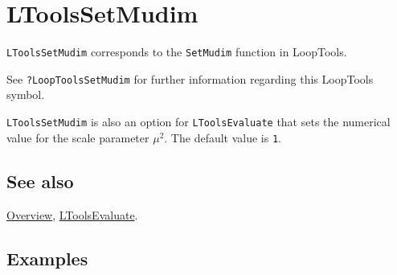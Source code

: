 \documentclass[../FeynHelpersManual.tex]{subfiles}
\begin{document}
\hypertarget{ltoolssetmudim}{
\section{LToolsSetMudim}\label{ltoolssetmudim}}

\texttt{LToolsSetMudim} corresponds to the \texttt{SetMudim} function in
LoopTools.

See \texttt{?LoopTools\textasciigrave SetMudim} for further information
regarding this LoopTools symbol.

\texttt{LToolsSetMudim} is also an option for \texttt{LToolsEvaluate}
that sets the numerical value for the scale parameter \(\mu^2\). The
default value is \texttt{1}.

\subsection{See also}

\hyperlink{toc}{Overview}, \hyperlink{ltoolsevaluate}{LToolsEvaluate}.

\subsection{Examples}
\end{document}
